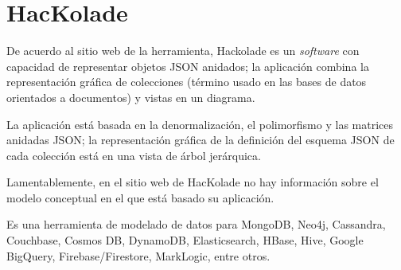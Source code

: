 \section{HacKolade}
De acuerdo al sitio web de la herramienta\cite{hackolade_hackolade_2020}, Hackolade es un \textit{software} con capacidad de representar objetos JSON anidados; la aplicación combina la representación gráfica de colecciones (término usado en las bases de datos orientados a documentos) y vistas en un diagrama.


La aplicación está basada en la denormalización, el polimorfismo y las matrices anidadas JSON; la representación gráfica de la definición del esquema JSON de cada colección está en una vista de árbol jerárquica. 


Lamentablemente, en el sitio web de HacKolade no hay información sobre el modelo conceptual en el que está basado su aplicación.


Es una herramienta de modelado de datos para MongoDB, Neo4j, Cassandra, Couchbase, Cosmos DB, DynamoDB, Elasticsearch, HBase, Hive, Google BigQuery, Firebase/Firestore, MarkLogic, entre otros.